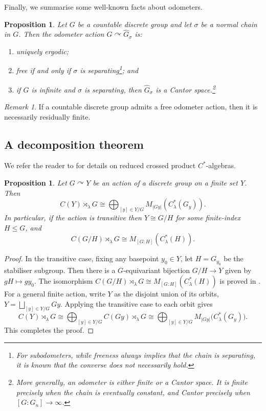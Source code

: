 \documentclass[11pt,a4,leqno]{amsart}
\newtheorem{prop}[thm]{Proposition}
\theoremstyle{definition}
\theoremstyle{remark}
\newtheorem{rem}[thm]{Remark}
\numberwithin{equation}{section}
\theoremstyle{plain}
\begin{document}
Finally, we summarise some well-known facts about odometers. 

\begin{prop}\label{P:properties}
Let $G$ be a countable discrete group and let $\sigma$ be a normal chain in $G$. Then the odometer action $G\curvearrowright \widehat{G}_\sigma$ is:
\begin{enumerate}
    \item uniquely ergodic;
    \item free if and only if $\sigma$ is separating\footnote{For subodometers, while freeness always implies that the chain is separating, it is known that the converse does not necessarily hold.}; and 
    \item if $G$ is infinite and $\sigma$ is separating, then $\widehat{G}_\sigma$ is
      a Cantor space.\footnote{More generally, an odometer is either finite or a Cantor space. It is finite precisely when the chain is eventually constant, and Cantor precisely when $[G:G_n] \to \infty$.}
\end{enumerate}
\end{prop}

\begin{rem}
    If a countable discrete group admits a free odometer action, then it is necessarily residually finite. 
\end{rem}

\subsection{A decomposition theorem}

We refer the reader to \cite{BroOza08} for details on reduced crossed product $C^*$-algebras.

\begin{prop}\label{P:decomp}
    Let $G\curvearrowright Y$ be an action of a discrete group on a finite set $Y$. Then 
    \[
        C(Y)\rtimes_\lambda G \cong \bigoplus_{[y]\in Y/G} M_{|Gy|}(C^*_\lambda(G_y)).
    \]
    In particular, if the action is transitive then $Y \cong G/H$ for some finite-index $H\le G$, and  
    \[
        C(G/H)\rtimes_\lambda G \cong M_{[G:H]}(C^*_\lambda(H)).
    \]
\end{prop}

\begin{proof}
In the transitive case, fixing any basepoint $y_0 \in Y$, let $H = G_{y_0}$ be the stabiliser subgroup. Then there is a $G$-equivariant bijection $G/H \to Y$ given by $gH \mapsto gy_0$. The isomorphism $C(G/H)\rtimes_\lambda G \cong M_{[G:H]}(C^*_\lambda(H))$ is proved in \cite[Proposition 2.3]{Sca20}. For a general finite action, write $Y$ as the disjoint union of its orbits, $Y=\bigsqcup_{[y]\in Y/G} Gy$. Applying the transitive case to each orbit gives
\[
C(Y)\rtimes_\lambda G \cong \bigoplus_{[y]\in Y/G} C(Gy)\rtimes_\lambda G\cong  \bigoplus_{[y]\in Y/G}
M_{|Gy|}\big(C_\lambda^*(G_y)\big).
\]
This completes the proof.
\end{proof}
\end{document}
